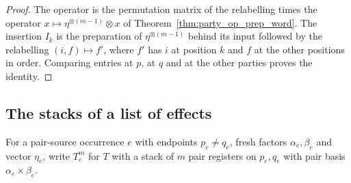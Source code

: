 \begin{proof}\leanok
    The operator is the permutation matrix of the relabelling times the operator
    $x\mapsto\eta^{\otimes(m-1)}\otimes x$ of Theorem~\ref{thm:party_op_prep_word}.
    The insertion $I_k$ is the preparation of $\eta^{\otimes(m-1)}$ behind its input
    followed by the relabelling $(i,f)\mapsto f'$, where $f'$ has $i$ at position $k$
    and $f$ at the other positions in order. Comparing entries at $p$, at $q$ and at
    the other parties proves the identity.
\end{proof}

\subsection{The stacks of a list of effects}
\label{sec:party_effect_stack_lists}

For a pair-source occurrence $e$ with endpoints $p_e\ne q_e$, fresh factors
$\alpha_e,\beta_e$ and vector $\eta_e$, write $T^m_e$ for $T$ with a stack of $m$ pair
registers on $p_e,q_e$ with pair basis $\alpha_e\times\beta_e$.

